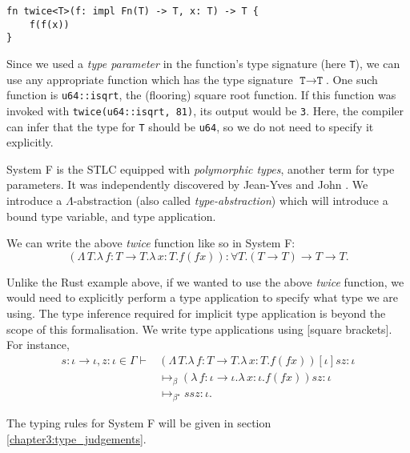 \begin{verbatim}
fn twice<T>(f: impl Fn(T) -> T, x: T) -> T {
    f(f(x))
}
\end{verbatim}

Since we used a \textit{type parameter} in the function's type signature (here \texttt{T}), we can
use any appropriate function which has the type signature $\texttt{T} \to \texttt{T}$. One such
function is \texttt{u64::isqrt}, the (flooring) square root function. If this function was invoked
with \texttt{twice(u64::isqrt, 81)}, its output would be \texttt{3}. Here, the compiler can infer
that the type for \texttt{T} should be \texttt{u64}, so we do not need to specify it explicitly.

System F is the STLC equipped with \textit{polymorphic types}, another term for type parameters. It
was independently discovered by Jean-Yves \citet{girard_interpretation_1972} and John
\citet{goos_towards_1974}. We introduce a $\Lambda$-abstraction (also called
\textit{type-abstraction}) which will introduce a bound type variable, and type application.

We can write the above \textit{twice} function like so in System F:
\begin{equation*}
  (\Lambda \, T. \lambda \, f \colon T \to T . \lambda \, x \colon T . f (f x))
  \colon \forall T . (T \to T) \to T \to T.
\end{equation*}

Unlike the Rust example above, if we wanted to use the above \textit{twice} function, we would need
to explicitly perform a type application to specify what type we are using. The type inference
required for implicit type application is beyond the scope of this formalisation. We write type
applications using [square brackets]. For instance,
\begin{align*}
  s \colon \iota \to \iota, z \colon \iota \in \Gamma \vdash
    &(\Lambda \, T. \lambda \, f \colon T \to T . \lambda \, x \colon T . f (f x))
    [\iota] s z \colon \iota\\
  &\mapsto_{\beta}
    (\lambda \, f \colon \iota \to \iota . \lambda \, x \colon \iota . f (f x)) s z \colon \iota\\
  &\mapsto_{\beta^{\star}} s s z \colon \iota.
\end{align*}

The typing rules for System F will be given in section \ref{chapter3:type_judgements}.
